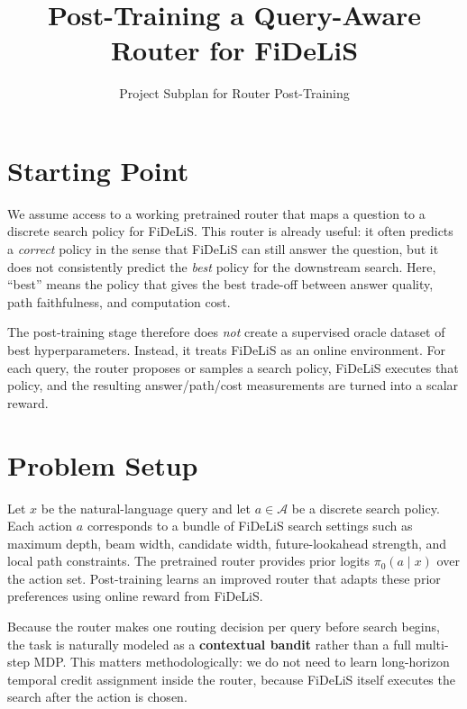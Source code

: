 \documentclass[11pt]{article}
\title{Post-Training a Query-Aware Router for FiDeLiS}
\author{Project Subplan for Router Post-Training}
\date{}
\begin{document}
\maketitle

\section{Starting Point}
We assume access to a working pretrained router that maps a question to a discrete search policy for FiDeLiS. This router is already useful: it often predicts a \emph{correct} policy in the sense that FiDeLiS can still answer the question, but it does not consistently predict the \emph{best} policy for the downstream search. Here, ``best'' means the policy that gives the best trade-off between answer quality, path faithfulness, and computation cost.

The post-training stage therefore does \emph{not} create a supervised oracle dataset of best hyperparameters. Instead, it treats FiDeLiS as an online environment. For each query, the router proposes or samples a search policy, FiDeLiS executes that policy, and the resulting answer/path/cost measurements are turned into a scalar reward.

\section{Problem Setup}
Let $x$ be the natural-language query and let $a \in \mathcal{A}$ be a discrete search policy. Each action $a$ corresponds to a bundle of FiDeLiS search settings such as maximum depth, beam width, candidate width, future-lookahead strength, and local path constraints. The pretrained router provides prior logits $\pi_0(a \mid x)$ over the action set. Post-training learns an improved router that adapts these prior preferences using online reward from FiDeLiS.

Because the router makes one routing decision per query before search begins, the task is naturally modeled as a \textbf{contextual bandit} rather than a full multi-step MDP. This matters methodologically: we do not need to learn long-horizon temporal credit assignment inside the router, because FiDeLiS itself executes the search after the action is chosen.
\end{document}
